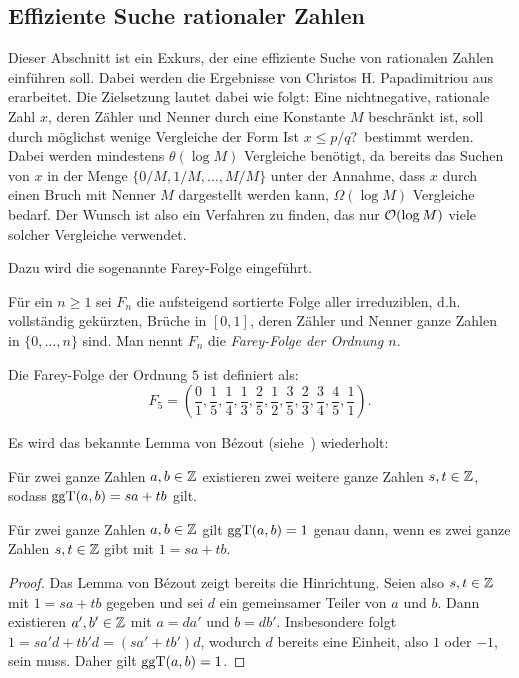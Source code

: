 \subsection{Effiziente Suche rationaler Zahlen}

Dieser Abschnitt ist ein Exkurs, der eine effiziente Suche von rationalen Zahlen einführen soll.
Dabei werden die Ergebnisse von Christos H. Papadimitriou aus~\cite{Papadimitriou1979} erarbeitet.
Die Zielsetzung lautet dabei wie folgt:
Eine nichtnegative, rationale Zahl $x$, deren Zähler und Nenner durch eine Konstante $M$ beschränkt ist, soll durch möglichst wenige Vergleiche der Form \glqq Ist $x\leq p/q$?\grqq\ bestimmt werden.
Dabei werden mindestens $\theta(\log M)$ Vergleiche benötigt, da bereits das Suchen von $x$ in der Menge $\{ 0/M, 1/M, \dots, M/M \}$ unter der Annahme, dass $x$ durch einen Bruch mit Nenner $M$ dargestellt werden kann, $\Omega(\log M)$ Vergleiche bedarf.
Der Wunsch ist also ein Verfahren zu finden, das nur $\mathcal{O}(\log M)$ viele solcher Vergleiche verwendet.

Dazu wird die sogenannte Farey-Folge eingeführt.

\begin{definition}
	Für ein $n\geq 1$ sei $F_n$ die aufsteigend sortierte Folge aller irreduziblen, d.h. vollständig gekürzten, Brüche in $[0,1]$, deren Zähler  und Nenner ganze Zahlen in $\{0, \dots, n\}$ sind.
	Man nennt $F_n$ die \emph{Farey-Folge der Ordnung $n$}.
\end{definition}

\begin{example}
	Die Farey-Folge der Ordnung $5$ ist definiert als:
	\[
		F_5 = \left( \frac{0}{1}, \frac{1}{5}, \frac{1}{4}, \frac{1}{3}, \frac{2}{5}, \frac{1}{2}, \frac{3}{5}, \frac{2}{3}, \frac{3}{4}, \frac{4}{5}, \frac{1}{1} \right).
	\]
\end{example}

Es wird das bekannte Lemma von Bézout (siehe~) wiederholt:
\begin{lemma}\label{lemma-von-bezout}
	Für zwei ganze Zahlen $a, b\in\mathbb{Z}$ existieren zwei weitere ganze Zahlen $s,t\in\mathbb{Z}$, sodass $\operatorname{ggT}(a,b) = sa + tb$ gilt.
\end{lemma}

\begin{corollary}\label{cor-bezout-reverted}
	Für zwei ganze Zahlen $a,b\in\mathbb{Z}$ gilt $\operatorname{ggT}(a,b) = 1$ genau dann, wenn es zwei ganze Zahlen $s,t\in\mathbb{Z}$ gibt mit $1 = sa + tb$.
\end{corollary}
\begin{proof}
	Das Lemma von Bézout zeigt bereits die Hinrichtung.
	Seien also $s,t\in\mathbb{Z}$ mit $1= sa +tb$ gegeben und sei $d$ ein gemeinsamer Teiler von $a$ und $b$.
	Dann existieren $a',b'\in\mathbb{Z}$ mit $a=d a'$ und $b=d b'$.
	Insbesondere folgt $1 = sa'd + tb'd = (sa' + tb') d$, wodurch $d$ bereits eine Einheit, also $1$ oder $-1$, sein muss.
	Daher gilt $\operatorname{ggT}(a,b)=1$.
\end{proof}

